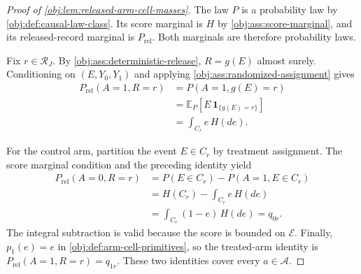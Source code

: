 \begin{proof}[Proof of \cref{obj:lem:released-arm-cell-masses}]
The law \(P\) is a probability law by \cref{obj:def:causal-law-class}. Its score marginal is \(H\) by \cref{obj:ass:score-marginal}, and its released-record marginal is \(P_{\mathrm{rel}}\). Both marginals are therefore probability laws. %

Fix \(r\in\mathcal R_J\). By \cref{obj:ass:deterministic-release}, \(R=g(E)\) almost surely. Conditioning on \((E,Y_0,Y_1)\) and applying \cref{obj:ass:randomized-assignment} gives
\[
\begin{aligned}
P_{\mathrm{rel}}(A=1,R=r)
&=P(A=1,g(E)=r)\\
&=\mathbb E_P\!\left[E\,\mathbf 1_{\{g(E)=r\}}\right]\\
&=\int_{C_r}e\,H(de).
\end{aligned}
\] %

For the control arm, partition the event \(E\in C_r\) by treatment assignment. The score marginal condition and the preceding identity yield
\[
\begin{aligned}
P_{\mathrm{rel}}(A=0,R=r)
&=P(E\in C_r)-P(A=1,E\in C_r)\\
&=H(C_r)-\int_{C_r}e\,H(de)\\
&=\int_{C_r}(1-e)\,H(de)
=q_{0r}.
\end{aligned}
\] %
The integral subtraction is valid because the score is bounded on \(\mathcal E\). Finally, \(p_1(e)=e\) in \cref{obj:def:arm-cell-primitives}, so the treated-arm identity is \(P_{\mathrm{rel}}(A=1,R=r)=q_{1r}\). These two identities cover every \(a\in\mathcal A\). %
\end{proof}
